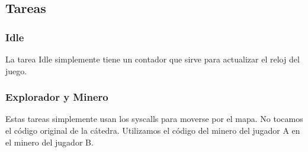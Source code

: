 



\subsection{Tareas}

\subsubsection{Idle}
La tarea Idle simplemente tiene un contador que sirve  para actualizar el reloj del juego.

\subsubsection{Explorador y Minero}
Estas tareas simplemente usan los syscalls para moverse por el mapa. No tocamos el código original de la cátedra. Utilizamos el código del minero del jugador A en el minero del jugador B.
